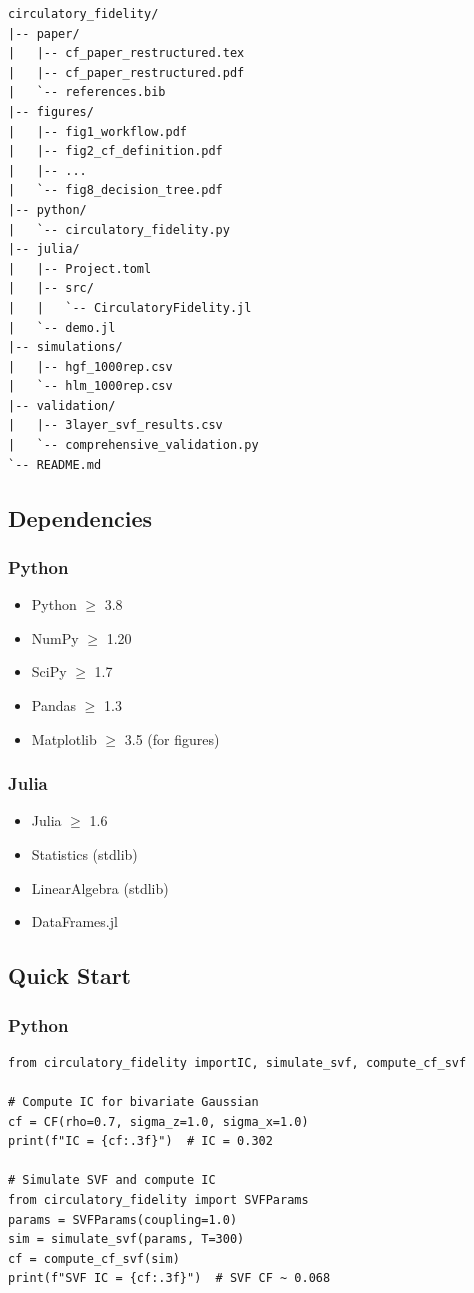 \documentclass[10pt]{article} %
\theoremstyle{plain}
\theoremstyle{definition}
\begin{document}
\begin{verbatim}
circulatory_fidelity/
|-- paper/
|   |-- cf_paper_restructured.tex
|   |-- cf_paper_restructured.pdf
|   `-- references.bib
|-- figures/
|   |-- fig1_workflow.pdf
|   |-- fig2_cf_definition.pdf
|   |-- ...
|   `-- fig8_decision_tree.pdf
|-- python/
|   `-- circulatory_fidelity.py
|-- julia/
|   |-- Project.toml
|   |-- src/
|   |   `-- CirculatoryFidelity.jl
|   `-- demo.jl
|-- simulations/
|   |-- hgf_1000rep.csv
|   `-- hlm_1000rep.csv
|-- validation/
|   |-- 3layer_svf_results.csv
|   `-- comprehensive_validation.py
`-- README.md
\end{verbatim}

\subsection{Dependencies}

\subsubsection{Python}
\begin{itemize}
\item Python $\geq$ 3.8
\item NumPy $\geq$ 1.20
\item SciPy $\geq$ 1.7
\item Pandas $\geq$ 1.3
\item Matplotlib $\geq$ 3.5 (for figures)
\end{itemize}

\subsubsection{Julia}
\begin{itemize}
\item Julia $\geq$ 1.6
\item Statistics (stdlib)
\item LinearAlgebra (stdlib)
\item DataFrames.jl
\end{itemize}

\subsection{Quick Start}

\subsubsection{Python}
\begin{lstlisting}
from circulatory_fidelity importIC, simulate_svf, compute_cf_svf

# Compute IC for bivariate Gaussian
cf = CF(rho=0.7, sigma_z=1.0, sigma_x=1.0)
print(f"IC = {cf:.3f}")  # IC = 0.302

# Simulate SVF and compute IC
from circulatory_fidelity import SVFParams
params = SVFParams(coupling=1.0)
sim = simulate_svf(params, T=300)
cf = compute_cf_svf(sim)
print(f"SVF IC = {cf:.3f}")  # SVF CF ~ 0.068
\end{lstlisting}
\end{document}

